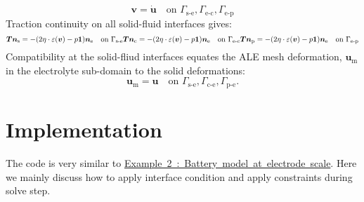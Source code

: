  \[ \boldsymbol{v}=\dot{\boldsymbol{u}} \quad \text{on } \Gamma_\text{s-e}, \Gamma_\text{e-c}, \Gamma_\text{e-p} \] Traction continuity on all solid-\/fluid interfaces gives\+: \[ \boldsymbol{T}\boldsymbol{n}_\text{s}=-(2\eta\cdot\varepsilon(\boldsymbol{v})-p\boldsymbol{1})\boldsymbol{n}_\text{e} \quad \text{on } \Gamma_\text{s-e} \\ \boldsymbol{T}\boldsymbol{n}_\text{c}=-(2\eta\cdot\varepsilon(\boldsymbol{v})-p\boldsymbol{1})\boldsymbol{n}_\text{e} \quad \text{on } \Gamma_\text{e-c} \\ \boldsymbol{T}\boldsymbol{n}_\text{p}=-(2\eta\cdot\varepsilon(\boldsymbol{v})-p\boldsymbol{1})\boldsymbol{n}_\text{e} \quad \text{on } \Gamma_\text{e-p} \] Compatibility at the solid-\/fliud interfaces equates the A\+LE mesh deformation, $\boldsymbol{u}_\text{m}$ in the electrolyte sub-\/domain to the solid deformations\+: \[ \boldsymbol{u}_\text{m}=\boldsymbol{u} \quad \text{on } \Gamma_\text{s-e}, \Gamma_\text{c-e}, \Gamma_\text{p-e}. \]  \hypertarget{battery_particle_Implementation}{}\section{Implementation}\label{battery_particle_Implementation}
The code is very similar to \mbox{\hyperlink{battery_electrode_scale}{Example 2 \+: Battery model at electrode scale}}. Here we mainly discuss how to apply interface condition and apply constraints during solve step.

